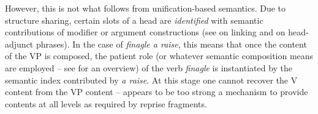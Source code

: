 \documentclass[output=paper,biblatex,babelshorthands,newtxmath,draftmode,colorlinks,citecolor=brown]{langscibook}
\begin{document}
%
However, this is not what follows from unification-based semantics.
%
Due to structure sharing, certain slots of a head are \emph{identified} with semantic contributions of modifier or argument constructions (see   {on linking and  on head-adjunct phrases}).
%
In the case of \textit{finagle a raise}, this means that once the content of the VP is composed, the patient role (or whatever semantic composition means are employed -- see  for an overview) of the verb \textit{finagle} is instantiated by the semantic index contributed by \textit{a raise}.
%
At this stage one cannot recover the V content from the VP content --  appears to be too strong a mechanism to provide contents at all levels as required by reprise fragments. 
\end{document}
